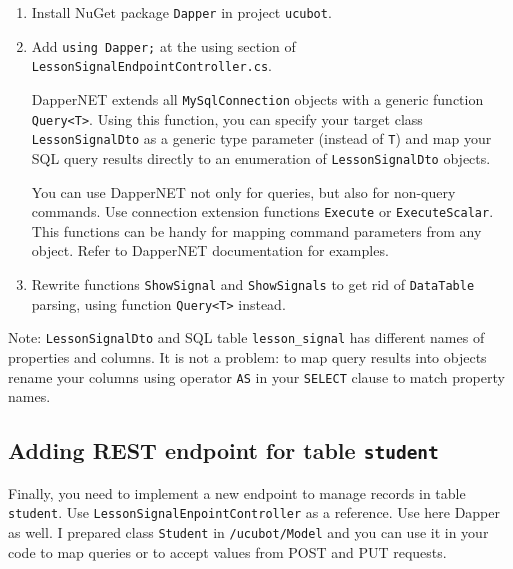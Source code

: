 \documentclass[12pt]{article}
\newcommand{\code}[1]{\texttt{#1}}
\begin{document}
\begin{enumerate}
\item Install NuGet package \code{Dapper} in project \code{ucubot}.
\item Add \code{using Dapper;} at the using section of \code{LessonSignalEndpointController.cs}.

DapperNET extends all \code{MySqlConnection} objects with a generic function \code{Query<T>}. Using this function, you can specify your target class \code{LessonSignalDto} as a generic type parameter (instead of \code{T}) and map your SQL query results directly to an enumeration of \code{LessonSignalDto} objects.

You can use DapperNET not only for queries, but also for non-query commands. Use connection extension functions \code{Execute} or \code{ExecuteScalar}. This functions can be handy for mapping command parameters from any object. Refer to DapperNET documentation for examples.

\item Rewrite functions \code{ShowSignal} and \code{ShowSignals} to get rid of \code{DataTable} parsing, using function \code{Query<T>} instead.
\end{enumerate}

Note: \code{LessonSignalDto} and SQL table \code{lesson\_signal} has different names of properties and columns. It is not a problem: to map query results into objects rename your columns using operator \code{AS} in your \code{SELECT} clause to match property names.

\subsection*{Adding REST endpoint for table \code{student}}

Finally, you need to implement a new endpoint to manage records in table \code{student}. Use \code{LessonSignalEnpointController} as a reference. Use here Dapper as well. I prepared class \code{Student} in \code{/ucubot/Model} and you can use it in your code to map queries or to accept values from POST and PUT requests.
\end{document}
